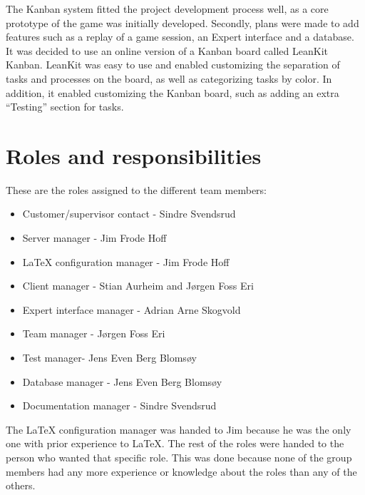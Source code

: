 The Kanban system fitted the project development process well, as a core 
prototype of the game was initially developed. Secondly, plans were made to 
add features such as a replay of a game session, an Expert interface and a 
database. It was decided to use an online version of a Kanban board called 
LeanKit Kanban. LeanKit was easy to use and enabled customizing the separation 
of tasks and processes on the board, as well as categorizing tasks by color. 
In addition, it enabled customizing the Kanban board, such as adding an extra 
“Testing” section for tasks.




\section{Roles and responsibilities}
These are the roles assigned to the different team members:

\begin{itemize} \setlength{\itemsep}{0cm}\setlength{\parskip}{0cm}
	\item Customer/supervisor contact - Sindre Svendsrud
	\item Server manager - Jim Frode Hoff
	\item LaTeX configuration manager - Jim Frode Hoff
	\item Client manager - Stian Aurheim and Jørgen Foss Eri
	\item Expert interface manager - Adrian Arne Skogvold
	\item Team manager - Jørgen Foss Eri
	\item Test manager- Jens Even Berg Blomsøy
	\item Database manager - Jens Even Berg Blomsøy
	\item Documentation manager - Sindre Svendsrud
\end{itemize}

The LaTeX configuration manager was handed to Jim because he was the only one with prior experience to LaTeX. The rest of the roles were handed to the person who wanted that specific role. This was done because none of the group members had any more experience or knowledge about the roles than any of the others.
\\\newline


